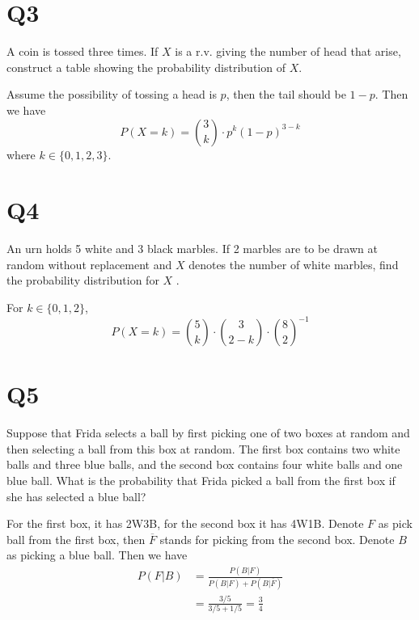 \documentclass[11pt]{article}
\begin{document}
\section*{Q3}
A coin is tossed three times. If $X$ is a r.v. giving the number 
of head that arise, construct a table showing the probability distribution 
of $X$.
\begin{solution}
    Assume the possibility of tossing a head is $p$, then the 
    tail should be $1-p$. Then we have
\begin{equation*}
  P(X=k)=\binom{3}{k}\cdot p^{k}(1-p)^{3-k}
\end{equation*}
where $k \in \{ 0,1,2,3 \}$.
\end{solution}


\section*{Q4}
An urn holds 5 white and 3 black marbles. If 2 marbles are to
be drawn at random without replacement and $X$ denotes the
number of white marbles, ﬁnd the probability distribution for
$X$ .
\begin{solution}
    For $k \in \{ 0,1,2 \}$,
    \begin{equation*}
      P(X=k)=\binom{5}{k}\cdot \binom{3}{2-k}\cdot
      \binom{8}{2}^{-1}
    \end{equation*}
\end{solution}

\section*{Q5}
Suppose that Frida selects a ball by ﬁrst picking one of two
boxes at random and then selecting a ball from this box at
random. The ﬁrst box contains two white balls and three blue
balls, and the second box contains four white balls and one
blue ball. What is the probability that Frida picked a ball from
the ﬁrst box if she has selected a blue ball?
\begin{solution}
    For the first box, it has 2W3B, for the second box it has 4W1B.
    Denote $F$ as pick ball from the first box, then $\overline{F}$
    stands for picking from the second box. Denote $B$ as picking a 
    blue ball. Then we have 
    \begin{align*}
        P(F \vert B)&=\frac{P(B\vert F)}{P(B \vert F)+P(B \vert \overline{F})}\\
        &=\frac{3 / 5}{3 / 5+1 / 5}=\frac{3}{4}
    \end{align*}
\end{solution}
\end{document}
